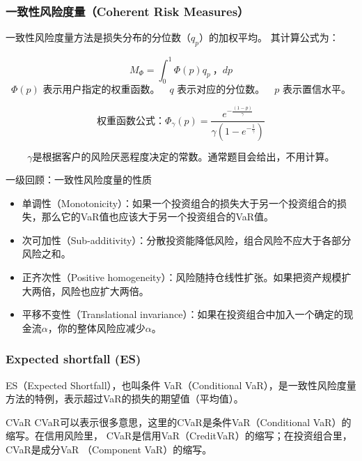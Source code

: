 \subsubsection{一致性风险度量（Coherent Risk Measures）}

一致性风险度量方法是损失分布的分位数（\(q_p\)）的加权平均。
其计算公式为：

   \[M_\Phi = \int_0^1 \Phi(p) q_p \ ， dp\]
\[\Phi(p) \text{ 表示用户指定的权重函数。} \quad q \text{ 表示对应的分位数。} \quad p \text{ 表示置信水平。}\]




\[\text{权重函数公式：}
\Phi_\gamma(p) = \frac{e^{-\frac{(1-p)}{\gamma}}}{\gamma(1 - e^{-\frac{1}{\gamma}})}
\]




\[\gamma\text{是根据客户的风险厌恶程度决定的常数。通常题目会给出，不用计算。}\]



\begin{note}{一级回顾：一致性风险度量的性质}
    \begin{itemize}
        \item 单调性（Monotonicity）：如果一个投资组合的损失大于另一个投资组合的损失，那么它的VaR值也应该大于另一个投资组合的VaR值。
        \item 次可加性（Sub-additivity）：分散投资能降低风险，组合风险不应大于各部分风险之和。
        \item 正齐次性（Positive homogeneity）：风险随持仓线性扩张。如果把资产规模扩大两倍，风险也应扩大两倍。
        \item 平移不变性（Translational invariance）：如果在投资组合中加入一个确定的现金流$\alpha$，你的整体风险应减少$\alpha$。
    \end{itemize}
\end{note}

\subsubsection{Expected shortfall (ES)}
ES（Expected Shortfall），也叫条件 VaR（Conditional VaR），是一致性风险度量方法的特例，表示超过VaR的损失的期望值（平均值）。
\begin{knowledgebox}{CVaR}
    CVaR可以表示很多意思，这里的CVaR是条件VaR（Conditional VaR）的缩写。在信用风险里，
    CVaR是信用VaR（CreditVaR）的缩写；在投资组合里，CVaR是成分VaR
    （Component VaR）的缩写。
    
\end{knowledgebox}


